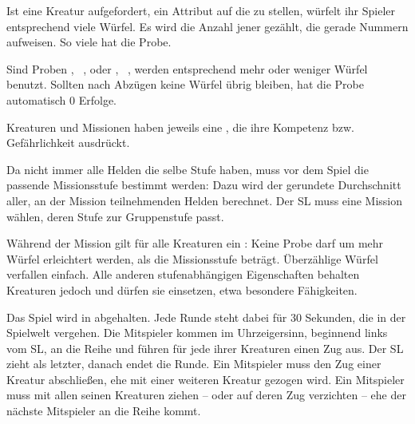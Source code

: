{		Ist eine Kreatur aufgefordert, ein Attribut auf die  zu stellen, würfelt ihr Spieler entsprechend viele Würfel. Es wird die Anzahl jener gezählt, die gerade Nummern aufweisen. So viele  hat die Probe.


		\noindent
		Sind Proben , \zB~, oder , \zB~, werden entsprechend mehr oder weniger Würfel benutzt. Sollten nach Abzügen keine Würfel übrig bleiben, hat die Probe automatisch 0 Erfolge.


		Kreaturen und Missionen haben jeweils eine , die ihre Kompetenz bzw. Gefährlichkeit ausdrückt.

		Da nicht immer alle Helden die selbe Stufe haben, muss vor dem Spiel die passende Missionsstufe bestimmt werden: Dazu wird der gerundete Durchschnitt aller, an der Mission teilnehmenden Helden berechnet. Der SL muss eine Mission wählen, deren Stufe zur Gruppenstufe passt.


		\noindent
		Während der Mission gilt für alle Kreaturen ein : Keine Probe darf um mehr Würfel erleichtert werden, als die Missionsstufe beträgt. Überzählige Würfel verfallen einfach. Alle anderen stufenabhängigen Eigenschaften behalten Kreaturen jedoch und dürfen sie einsetzen, etwa besondere Fähigkeiten.


		Das Spiel wird in  abgehalten. Jede Runde steht dabei für 30 Sekunden, die in der Spielwelt vergehen. Die Mitspieler kommen im Uhrzeigersinn, beginnend links vom SL, an die Reihe und führen für jede ihrer Kreaturen einen Zug aus. Der SL zieht als letzter, danach endet die Runde. Ein Mitspieler muss den Zug einer Kreatur abschließen, ehe mit einer weiteren Kreatur gezogen wird. Ein Mitspieler muss mit allen seinen Kreaturen ziehen -- oder auf deren Zug verzichten -- ehe der nächste Mitspieler an die Reihe kommt.

}
